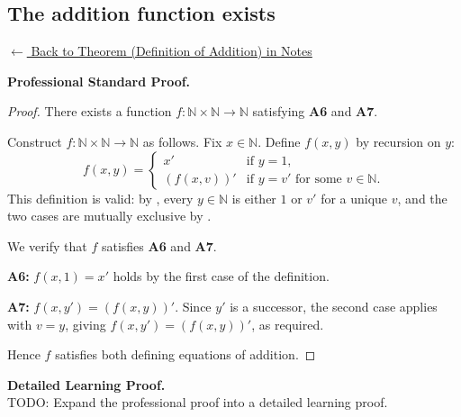 
\subsection*{The addition function exists}
\label{prf:landau-addition-exists}

\begin{remark*}[Return]
\hyperref[thm:landau-addition-exists-unique]{$\leftarrow$ Back to Theorem
(Definition of Addition) in Notes}
\end{remark*}

\textbf{Professional Standard Proof.}~\\
\begin{proof}
\Claim There exists a function $f : \mathbb{N} \times \mathbb{N} \to \mathbb{N}$
satisfying \textbf{A6} and \textbf{A7}.

Construct $f : \mathbb{N} \times \mathbb{N} \to \mathbb{N}$ as follows.
Fix $x \in \mathbb{N}$. Define $f(x, y)$ by recursion on $y$:
\[
  f(x, y) = \begin{cases}
    x'         & \text{if } y = 1, \\
    (f(x, v))' & \text{if } y = v' \text{ for some } v \in \mathbb{N}.
  \end{cases}
\]
This definition is valid: by ,
every $y \in \mathbb{N}$ is either $1$ or $v'$ for a unique $v$, and the two
cases are mutually exclusive by .

We verify that $f$ satisfies \textbf{A6} and \textbf{A7}.

\textbf{A6:} $f(x,1) = x'$ holds by the first case of the definition.

\textbf{A7:} $f(x,y') = (f(x,y))'$. Since $y'$ is a successor, the second
case applies with $v = y$, giving $f(x, y') = (f(x,y))'$, as required.

Hence $f$ satisfies both defining equations of addition.
\end{proof}

\textbf{Detailed Learning Proof.}~\\
TODO: Expand the professional proof into a detailed learning proof.



